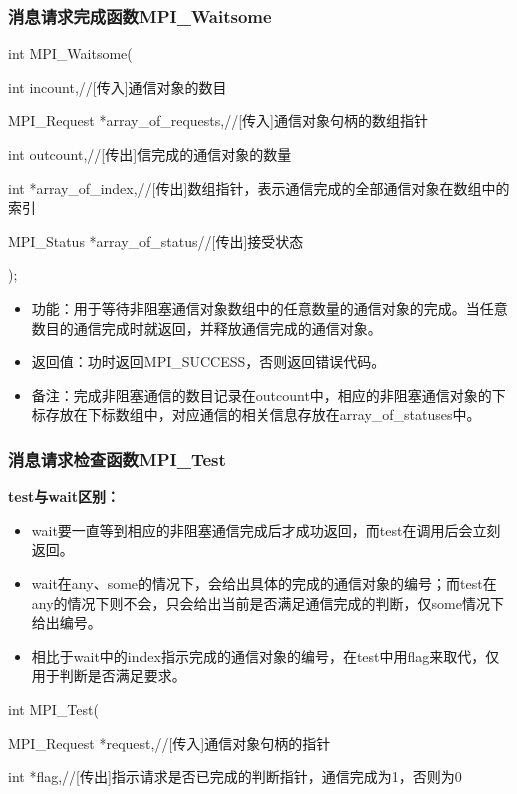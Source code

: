 \documentclass[UTF8]{article}%
\begin{document}
\subsubsection{消息请求完成函数MPI\_Waitsome}

int MPI\_Waitsome(

    \qquad int         incount,//[传入]通信对象的数目

    \qquad MPI\_Request *array\_of\_requests,//[传入]通信对象句柄的数组指针

    \qquad int         outcount,//[传出]信完成的通信对象的数量

    \qquad int         *array\_of\_index,//[传出]数组指针，表示通信完成的全部通信对象在数组中的索引

    \qquad MPI\_Status  *array\_of\_status//[传出]接受状态

);

\begin{itemize}
    \item 功能：用于等待非阻塞通信对象数组中的任意数量的通信对象的完成。当任意数目的通信完成时就返回，并释放通信完成的通信对象。
    \item 返回值：功时返回MPI\_SUCCESS，否则返回错误代码。
    \item 备注：完成非阻塞通信的数目记录在outcount中，相应的非阻塞通信对象的下标存放在下标数组中，对应通信的相关信息存放在array\_of\_statuses中。
\end{itemize}

\subsubsection{消息请求检查函数MPI\_Test}

\textbf{test与wait区别：}

\begin{itemize}
    \item wait要一直等到相应的非阻塞通信完成后才成功返回，而test在调用后会立刻返回。
    \item wait在any、some的情况下，会给出具体的完成的通信对象的编号；而test在any的情况下则不会，只会给出当前是否满足通信完成的判断，仅some情况下给出编号。
    \item 相比于wait中的index指示完成的通信对象的编号，在test中用flag来取代，仅用于判断是否满足要求。
\end{itemize}

int MPI\_Test(

    \qquad MPI\_Request  *request,//[传入]通信对象句柄的指针

    \qquad int           *flag,//[传出]指示请求是否已完成的判断指针，通信完成为1，否则为0
\end{document}
